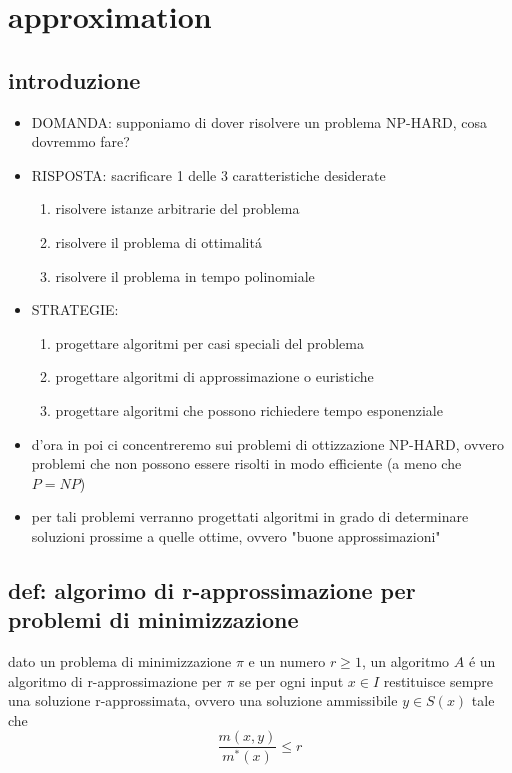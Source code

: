 \section*{approximation}


\subsection*{introduzione}
\begin{flushleft}
	\begin{itemize}
		\item DOMANDA: supponiamo di dover risolvere un problema NP-HARD, cosa dovremmo fare?
		\item RISPOSTA: sacrificare 1 delle 3 caratteristiche desiderate
		\begin{enumerate}
			\item risolvere istanze arbitrarie del problema
			\item risolvere il problema di ottimalit\'a
			\item risolvere il problema in tempo polinomiale
		\end{enumerate}
		\item STRATEGIE:
		\begin{enumerate}
			\item progettare algoritmi per casi speciali del problema 
			\item progettare algoritmi di approssimazione o euristiche
			\item progettare algoritmi che possono richiedere tempo esponenziale
		\end{enumerate}
		\item d'ora in poi ci concentreremo sui problemi di ottizzazione NP-HARD, ovvero problemi che non possono essere risolti in modo efficiente (a meno che $P=NP$)
		\item per tali problemi verranno progettati algoritmi in grado di determinare soluzioni prossime a quelle ottime, ovvero "buone approssimazioni"
	\end{itemize}
\end{flushleft}


\subsection*{def: algorimo di r-approssimazione per problemi di minimizzazione}
\begin{flushleft}
	dato un problema di minimizzazione $\pi$ e un numero $r\geq 1$, un algoritmo $A$ \'e un algoritmo di r-approssimazione per $\pi$ se per ogni input $x\in I$ restituisce sempre una soluzione r-approssimata, ovvero una soluzione ammissibile $y\in S(x)$ tale che
	$$\frac{m(x,y)}{m^*(x)}\leq r$$
\end{flushleft}

